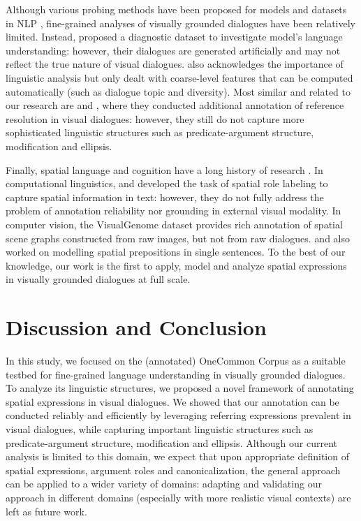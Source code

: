 Although various probing methods have been proposed for models and datasets in NLP \citep{belinkov-glass-2019-analysis,geva-etal-2019-modeling,kaushik2019learning,gardner2020evaluating,ribeiro-etal-2020-beyond}, fine-grained analyses of visually grounded dialogues have been relatively limited. Instead, \citet{kottur-etal-2019-clevr} proposed a diagnostic dataset to investigate model's language understanding: however, their dialogues are generated artificially and may not reflect the true nature of visual dialogues. \citet{shekhar-etal-2019-beyond} also acknowledges the importance of linguistic analysis but only dealt with coarse-level features that can be computed automatically (such as dialogue topic and diversity). Most similar and related to our research are \citet{yu-etal-2019-see} and \citet{udagawa2020annotated}, where they conducted additional annotation of reference resolution in visual dialogues: however, they still do not capture more sophisticated linguistic structures such as predicate-argument structure, modification and ellipsis.

Finally, spatial language and cognition have a long history of research \citep{talmy1983language,herskovits1987language}. In computational linguistics, \citet{kordjamshidi-etal-2010-spatial} and \citet{pustejovsky2015semeval} developed the task of spatial role labeling to capture spatial information in text: however, they do not fully address the problem of annotation reliability nor grounding in external visual modality. In computer vision, the VisualGenome dataset \citep{krishna2017visual} provides rich annotation of spatial scene graphs constructed from raw images, but not from raw dialogues. \citet{ramisa-etal-2015-combining} and \citet{platonov2018computational} also worked on modelling spatial prepositions in single sentences. To the best of our knowledge, our work is the first to apply, model and analyze spatial expressions in visually grounded dialogues at full scale.

\section{Discussion and Conclusion}
\label{05_sec:conclusion}

In this study, we focused on the (annotated) OneCommon Corpus as a suitable testbed for fine-grained language understanding in visually grounded dialogues. To analyze its linguistic structures, we proposed a novel framework of annotating spatial expressions in visual dialogues. We showed that our annotation can be conducted reliably and efficiently by leveraging referring expressions prevalent in visual dialogues, while capturing important linguistic structures such as predicate-argument structure, modification and ellipsis. Although our current analysis is limited to this domain, we expect that upon appropriate definition of spatial expressions, argument roles and canonicalization, the general approach can be applied to a wider variety of domains: adapting and validating our approach in different domains (especially with more realistic visual contexts) are left as future work.

